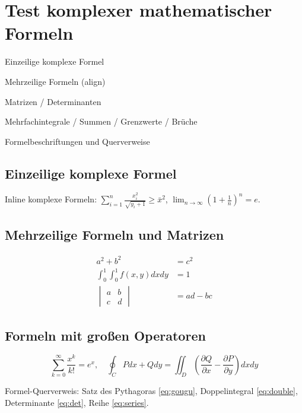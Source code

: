 \documentclass[de]{../../elegantbook}
\begin{document}
\chapter{Test komplexer mathematischer Formeln}
\begin{introduction}
\item Einzeilige komplexe Formel
\item Mehrzeilige Formeln (align)
\item Matrizen / Determinanten
\item Mehrfachintegrale / Summen / Grenzwerte / Brüche
\item Formelbeschriftungen und Querverweise
\end{introduction}

\section{Einzeilige komplexe Formel}
Inline komplexe Formeln: $\sum_{i=1}^n \frac{x_i^2}{\sqrt{y_i+1}} \geq \bar{x}^2$, $\lim_{n\to\infty} \left(1+\frac{1}{n}\right)^n = e$.

\section{Mehrzeilige Formeln und Matrizen}
\begin{align}
a^2 + b^2 &= c^2 \label{eq:gougu} \\
\int_{0}^{1}\int_{0}^{1} f(x,y) dxdy &= 1 \label{eq:double} \\
\begin{vmatrix}
a & b \\
c & d
\end{vmatrix} &= ad-bc \label{eq:det}
\end{align}

\section{Formeln mit großen Operatoren}
\begin{equation}\label{eq:series}
\sum_{k=0}^{\infty} \frac{x^k}{k!} = e^x,\quad \oint_{C} Pdx+Qdy = \iint_{D}\left(\frac{\partial Q}{\partial x}-\frac{\partial P}{\partial y}\right)dxdy
\end{equation}

Formel-Querverweis: Satz des Pythagoras \eqref{eq:gougu}, Doppelintegral \eqref{eq:double}, Determinante \eqref{eq:det}, Reihe \eqref{eq:series}.
\end{document}
